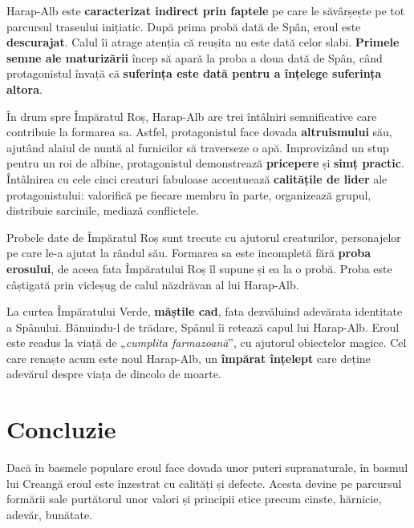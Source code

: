 \documentclass{article}
\newcommand{\qu}[1]{„\emph{#1}”}
\begin{document}
Harap-Alb este \textbf{caracterizat indirect prin faptele} pe care le săvârșește pe tot parcursul traseului inițiatic. După prima probă dată de Spân, eroul este \textbf{descurajat}. Calul îi atrage atenția că reușita nu este dată celor slabi. \textbf{Primele semne ale maturizării} încep să apară la proba a doua dată de Spân, când protagonistul învață că \textbf{suferința este dată pentru a înțelege suferința altora}.

În drum spre Împăratul Roș, Harap-Alb are trei întâlniri semnificative care contribuie la formarea sa. Astfel, protagonistul face dovada \textbf{altruismului} său, ajutând alaiul de nuntă al furnicilor să traverseze o apă. Improvizând un stup pentru un roi de albine, protagonistul demonstrează \textbf{pricepere} și \textbf{simț practic}. Întâlnirea cu cele cinci creaturi fabuloase accentuează \textbf{calitățile de lider} ale protagonistului: valorifică pe fiecare membru în parte, organizează grupul, distribuie sarcinile, mediază conflictele.

Probele date de Împăratul Roș sunt trecute cu ajutorul creaturilor, personajelor pe care le-a ajutat la rândul său. Formarea sa este incompletă fără \textbf{proba erosului}, de aceea fata Împăratului Roș îl supune și ea la o probă. Proba este câștigată prin vicleșug de calul năzdrăvan al lui Harap-Alb.

La curtea Împăratului Verde, \textbf{măștile cad}, fata dezvăluind adevărata identitate a Spânului. Bănuin\-du-l de trădare, Spânul îi retează capul lui Harap-Alb. Eroul este readus la viață de \qu{cumplita farmazoană}, cu ajutorul obiectelor magice. Cel care renaște acum este noul Harap-Alb, un \textbf{împărat înțelept} care deține adevărul despre viața de dincolo de moarte.
\section{Concluzie}
Dacă în basmele populare eroul face dovada unor puteri supranaturale, în basmul lui Creangă eroul este înzestrat cu calități și defecte. Acesta devine pe parcursul formării sale purtătorul unor valori și principii etice precum cinste, hărnicie, adevăr, bunătate.
\end{document}
